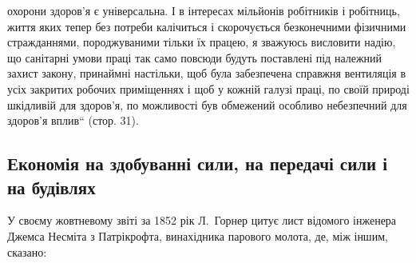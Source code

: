 \parcont{}  %
охорони здоров’я є універсальна. І в інтересах мільйонів робітників і робітниць, життя яких тепер
без потреби калічиться
і скорочується безконечними фізичними стражданнями, породжуваними тільки їх працею, я зважуюсь
висловити надію, що
санітарні умови праці так само повсюди будуть поставлені під
належний захист закону, принаймні настільки, щоб була забезпечена справжня вентиляція в усіх
закритих робочих приміщеннях і щоб у кожній галузі праці, по своїй природі шкідливій для здоров’я,
по можливості був обмежений особливо
небезпечний для здоров’я вплив“ (стор. 31).

\subsection{Економія на здобуванні сили, на передачі сили і на будівлях}

У своєму жовтневому звіті за 1852 рік Л.~Горнер цитує лист
відомого інженера Джемса Несміта з Патрікрофта, винахідника
парового молота, де, між іншим, сказано:

